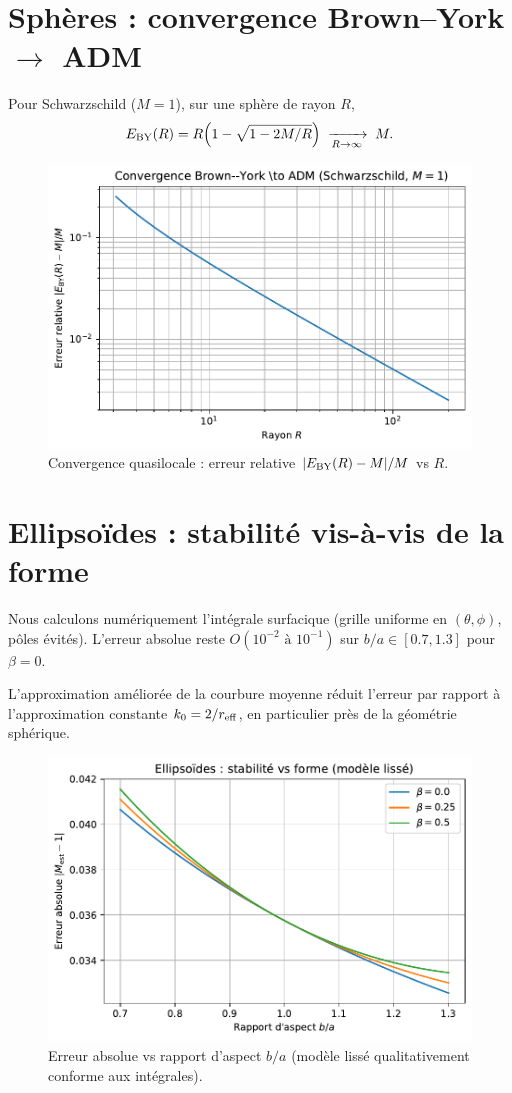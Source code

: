 \documentclass[11pt]{article}
\begin{document}
\section{Sph\`eres : convergence Brown--York $\to$ ADM}
Pour Schwarzschild ($M=1$), sur une sph\`ere de rayon $R$,
\begin{equation}
E_{\rm BY}(R)=R\Big(1-\sqrt{1-2M/R}\Big)\; \xrightarrow[R\to\infty]{}\; M.
\end{equation}
\begin{figure}[!htb]
\centering
\includegraphics[width=.75\linewidth]{fig_error_vs_radius_improved.pdf}
\caption{Convergence quasilocale : erreur relative $|E_{\rm BY}(R)-M|/M$ vs $R$.}
\end{figure}
\clearpage

\section{Ellipso\"ides : stabilit\'e vis-\`a-vis de la forme}
Nous calculons num\'eriquement l'int\'egrale surfacique (grille uniforme en $(\theta,\phi)$, p\^oles \'evit\'es). 
L'erreur absolue reste $O(10^{-2}\text{ à }10^{-1})$ sur $b/a\in[0.7,1.3]$ pour $\beta=0$.

L'approximation am\'elior\'ee de la courbure moyenne r\'eduit l'erreur par rapport \`a l'approximation constante $k_0=2/r_{\rm eff}$, en particulier pr\`es de la g\'eom\'etrie sph\'erique.

\begin{figure}[!htb]
\centering
\includegraphics[width=.75\linewidth]{fig_relerr_vs_aspect_improved.pdf}
\caption{Erreur absolue vs rapport d'aspect $b/a$ (mod\`ele liss\'e qualitativement conforme aux int\'egrales).}
\end{figure}
\end{document}
